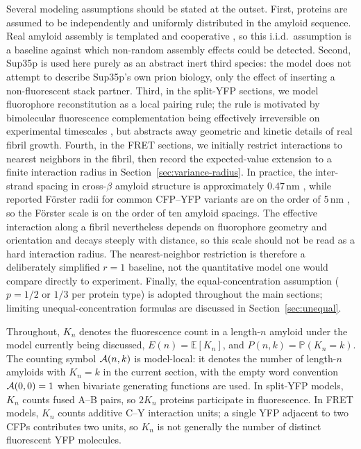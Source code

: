 \documentclass[11pt]{article}
\newcommand{\cA}{ {\cal A} }
\begin{document}
Several modeling assumptions should be stated at the outset. First, proteins are assumed to be independently and uniformly distributed in the amyloid sequence. Real amyloid assembly is templated and cooperative \cite{chiti2006}, so this i.i.d.\ assumption is a baseline against which non-random assembly effects could be detected. Second, Sup35p is used here purely as an abstract inert third species: the model does not attempt to describe Sup35p's own prion biology, only the effect of inserting a non-fluorescent stack partner. Third, in the split-YFP sections, we model fluorophore reconstitution as a local pairing rule; the rule is motivated by bimolecular fluorescence complementation being effectively irreversible on experimental timescales \cite{hu2002,kerppola2006}, but abstracts away geometric and kinetic details of real fibril growth. Fourth, in the FRET sections, we initially restrict interactions to nearest neighbors in the fibril, then record the expected-value extension to a finite interaction radius in Section~\ref{sec:variance-radius}. In practice, the inter-strand spacing in cross-$\beta$ amyloid structure is approximately 0.47\,nm \cite{sunde1997}, while reported F\"{o}rster radii for common CFP--YFP variants are on the order of $5$\,nm \cite{patterson2000,lakowicz2006}, so the F\"{o}rster scale is on the order of ten amyloid spacings. The effective interaction along a fibril nevertheless depends on fluorophore geometry and orientation and decays steeply with distance, so this scale should not be read as a hard interaction radius. The nearest-neighbor restriction is therefore a deliberately simplified $r=1$ baseline, not the quantitative model one would compare directly to experiment. Finally, the equal-concentration assumption ($p = 1/2$ or $1/3$ per protein type) is adopted throughout the main sections; limiting unequal-concentration formulas are discussed in Section~\ref{sec:unequal}.

Throughout, $K_n$ denotes the fluorescence count in a length-$n$ amyloid under the model currently being discussed, $E(n)=\mathbb{E}[K_n]$, and $P(n,k)=\mathbb{P}(K_n=k)$. The counting symbol $\cA(n,k)$ is model-local: it denotes the number of length-$n$ amyloids with $K_n=k$ in the current section, with the empty word convention $\cA(0,0)=1$ when bivariate generating functions are used. In split-YFP models, $K_n$ counts fused A--B pairs, so $2K_n$ proteins participate in fluorescence. In FRET models, $K_n$ counts additive C--Y interaction units; a single YFP adjacent to two CFPs contributes two units, so $K_n$ is not generally the number of distinct fluorescent YFP molecules.
\end{document}
